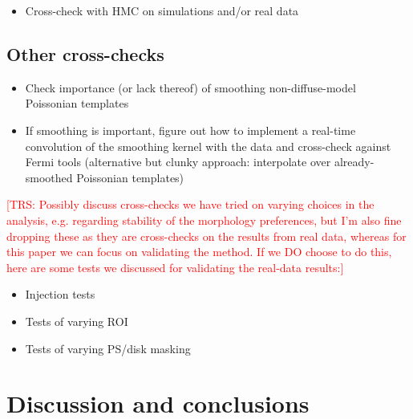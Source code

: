 \documentclass[prd,aps,10pt,nofootinbib,twocolumn,superscriptaddress,preprintnumbers,balancelastpage,longbibliography,floatfix]{revtex4-2}
\def\trs#1{\textcolor{red}{[TRS: #1]}}
\begin{document}
\begin{itemize}
\item Cross-check with HMC on simulations and/or real data
\end{itemize}

\subsection{Other cross-checks}

\begin{itemize}
\item Check importance (or lack thereof) of smoothing non-diffuse-model Poissonian templates
\item If smoothing is important, figure out how to implement a real-time convolution of the smoothing kernel with the data and cross-check against Fermi tools (alternative but clunky approach: interpolate over already-smoothed Poissonian templates)
\end{itemize}

\trs{Possibly discuss cross-checks we have tried on varying choices in the analysis, e.g. regarding stability of the morphology preferences, but I'm also fine dropping these as they are cross-checks on the results from real data, whereas for this paper we can focus on validating the method. If we DO choose to do this, here are some tests we discussed for validating the real-data results:}

\begin{itemize}
\item Injection tests
\item Tests of varying ROI
\item Tests of varying PS/disk masking
\end{itemize}

\section{Discussion and conclusions} 
\label{sec:conclusion}

\end{document}
